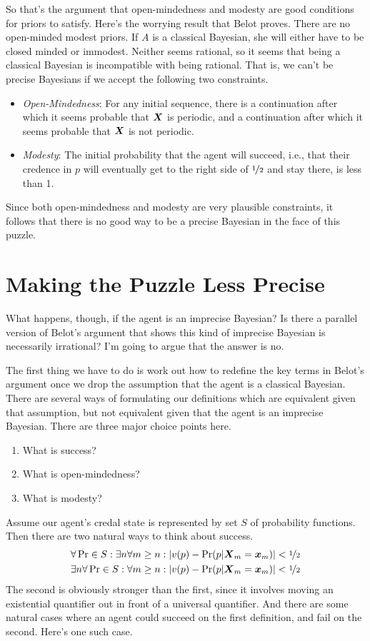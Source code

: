 So that's the argument that open-mindedness and modesty are good conditions for priors to satisfy. Here's the worrying result that Belot proves. There are no open-minded modest priors. If $A$ is a classical Bayesian, she will either have to be closed minded or immodest. Neither seems rational, so it seems that being a classical Bayesian is incompatible with being rational. That is, we can't be precise Bayesians if we accept the following two constraints.

%
\begin{itemize}
\item \textit{Open-Mindedness}: For any initial sequence, there is a continuation after which it seems probable that $\boldsymbol{X}$ is periodic, and a continuation after which it seems probable that $\boldsymbol{X}$ is not periodic.
\item \textit{Modesty}: The initial probability that the agent will succeed, i.e., that their credence in $p$ will eventually get to the right side of $\nicefrac{1}{2}$ and stay there, is less than 1.
\end{itemize}
%
Since both open-mindedness and modesty are very plausible constraints, it follows that there is no good way to be a precise Bayesian in the face of this puzzle.

\section{Making the Puzzle Less Precise}

What happens, though, if the agent is an imprecise Bayesian? Is there a parallel version of Belot's argument that shows this kind of imprecise Bayesian is necessarily irrational? I'm going to argue that the answer is no.

The first thing we have to do is work out how to redefine the key terms in Belot's argument once we drop the assumption that the agent is a classical Bayesian. There are several ways of formulating our definitions which are equivalent given that assumption, but not equivalent given that the agent is an imprecise Bayesian. There are three major choice points here.

\begin{enumerate}
\item What is success?
\item What is open-mindedness?
\item What is modesty?
\end{enumerate}
Assume our agent's credal state is represented by set $S$ of probability functions. Then there are two natural ways to think about success.
%
\begin{align}
\forall \Pr \in S:  \exists n \forall m \geq n: |v(p) - \Pr(p | \boldsymbol{X}_m= \boldsymbol{x}_m)| < \nicefrac{1}{2} \\
\exists n \forall \Pr \in S: \forall m \geq n: |v(p) - \Pr(p | \boldsymbol{X}_m= \boldsymbol{x}_m)| < \nicefrac{1}{2}
\end{align}
%
The second is obviously stronger than the first, since it involves moving an existential quantifier out in front of a universal quantifier. And there are some natural cases where an agent could succeed on the first definition, and fail on the second. Here's one such case.

